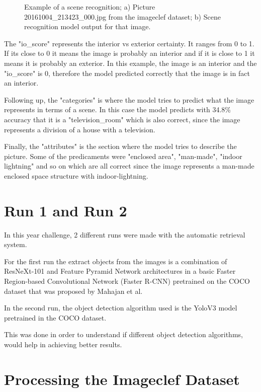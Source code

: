 \begin{figure}[H]
\begin{subfigure}{0.4\textwidth}
    \caption{}
    \end{subfigure}
    
    \caption{Example of a scene recognition; a) Picture 20161004\_213423\_000.jpg from the imageclef dataset; b) Scene recognition model output for that image.}

    \label{fig:imagea}
    \end{figure}


    The "io\_score" represents the interior vs exterior certainty. It ranges from 0 to 1. If its close to 0 it means the image is probably an interior and if it is close to 1 it means it is probably an exterior. In this example, the image is an interior and the "io\_score" is 0, therefore the model predicted correctly that the image is in fact an interior.

    Following up, the "categories" is where the model tries to predict what the image represents in terms of a scene. In this case the model predicts with 34.8\% accuracy that it is a "television\_room" which is also correct, since the image represents a division of a house with a television.

    Finally, the "attributes" is the section where the model tries to describe the picture. Some of the predicaments were "enclosed area", "man-made", "indoor lightning" and so on which are all correct since the image represents a man-made enclosed space structure with indoor-lightning.

\section{Run  1 and Run 2}
\label{sec:runs}
    In this year challenge, 2 different runs were made with the automatic retrieval system. 
    
    For the first run the extract objects from the images is a combination of ResNeXt-101 and Feature Pyramid Network architectures in a basic Faster Region-based Convolutional Network (Faster R-CNN) pretrained on the COCO dataset that was proposed by Mahajan et al. \cite{Mahajan2018}
    
    In the second run, the object detection algorithm used is the YoloV3 \cite{Redmon2018} model pretrained in the COCO dataset. 

    This was done in order to understand if different object detection algorithms, would help in achieving better results.

\section{Processing the Imageclef Dataset}
\label{sec:process_dataset}


